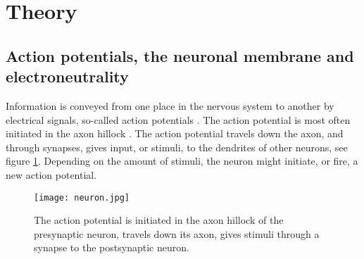 \documentclass{article}
\begin{document}
\section{Theory}
\subsection{Action potentials, the neuronal membrane and electroneutrality}\label{APs,neuronal membrane, el.neutrality}
Information is conveyed from one place in the nervous system to another by electrical signals, so-called action potentials \cite{Neuroscience}. The action potential is most often initiated in the axon hillock \cite{newworldencyclopedia}. The action potential travels down the axon, and through synapses, gives input, or stimuli, to the dendrites of other neurons, see figure \ref{fig:neuron}. Depending on the amount of stimuli, the neuron might initiate, or fire, a new action potential. 


\begin{figure}
  \texttt{[image: neuron.jpg]}
  \caption{The action potential is initiated in the axon hillock of the presynaptic neuron, travels down its axon, gives stimuli through a synapse to the postsynaptic neuron. }
  \label{fig:neuron}
\end{figure}
\end{document}
